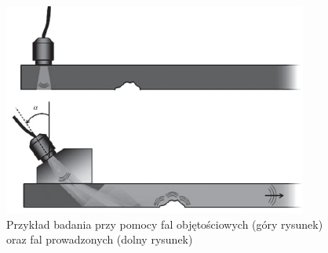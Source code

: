 \begin{figure}[h]
\centering
\includegraphics[width=10cm]{Zdjecia/1/badania_falami}
\caption{Przykład badania przy pomocy fal objętościowych (góry rysunek) oraz fal prowadzonych (dolny rysunek) \cite{bartek_rose}}
\label{fig:badania_falami}
\end{figure}
















